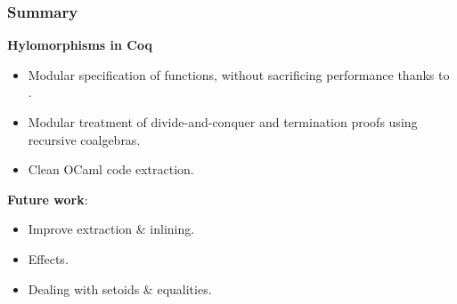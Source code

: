 \begin{frame}
  \frametitle{Summary}

  \textbf{Hylomorphisms in Coq}
  \begin{itemize}
  \item Modular specification of functions, without sacrificing performance
thanks to .
  \item Modular treatment of divide-and-conquer and termination proofs using recursive coalgebras.
  \item Clean OCaml code extraction.
  \end{itemize}

  \vspace{.6cm}
  \begin{overprint}
  \textbf{Future work}:
  \begin{itemize}
    \item Improve extraction \& inlining.
    \item Effects.
    \item Dealing with setoids \& equalities.
  \end{itemize}
  \end{overprint}

\end{frame}
